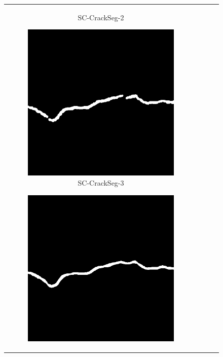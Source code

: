 \documentclass[a4paper,12pt]{report}
\begin{document}
\begin{figure}[htbp]
\begin{tabular}{cccc}
\begin{subfigure}[b]{0.23\textwidth}
            \caption{SC-CrackSeg-2}
            \label{fig:crackseg-experiment-qualitative-sc-crackseg-2}
        \end{subfigure}
        \begin{subfigure}[b]{0.23\textwidth}
            \centering
            \includegraphics[width=\textwidth]{res/crackseg-experiment-qualitative/sc-crackseg-3.png}
            \caption{SC-CrackSeg-3}
            \label{fig:crackseg-experiment-qualitative-sc-crackseg-3}
        \end{subfigure}
        \begin{subfigure}[b]{0.23\textwidth}
            \centering
            \includegraphics[width=\textwidth]{res/crackseg-experiment-qualitative/sc-crackseg-4.png}

\end{subfigure}
\end{tabular}
\end{figure}
\end{document}
